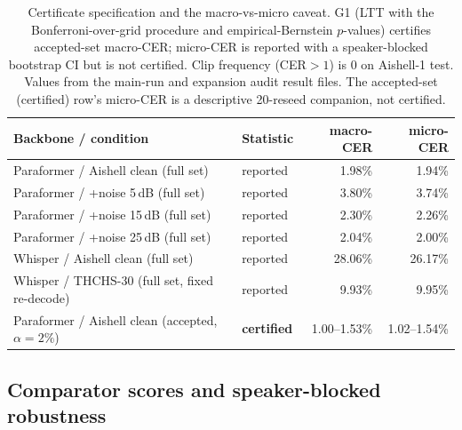\documentclass[11pt]{article}
\begin{document}
\begin{table}[t]
  \centering
  \caption{Certificate specification and the macro-vs-micro caveat. G1 (LTT with the
  Bonferroni-over-grid procedure and empirical-Bernstein $p$-values) certifies accepted-set
  macro-CER; micro-CER is reported with a speaker-blocked bootstrap CI but is
  not certified. Clip frequency (CER${}>1$) is 0 on Aishell-1 test.
  Values from the main-run and expansion audit result files. The accepted-set (certified)
  row's micro-CER is a descriptive 20-reseed companion,
  not certified.}%
  \label{tab:cert}
  \begin{tabular}{llrr}
    \toprule
    Backbone / condition & Statistic & macro-CER & micro-CER \\
    \midrule
    Paraformer / Aishell clean (full set)   & reported & 1.98\% & 1.94\% \\
    Paraformer / +noise 5\,dB (full set)    & reported & 3.80\% & 3.74\% \\
    Paraformer / +noise 15\,dB (full set)   & reported & 2.30\% & 2.26\% \\
    Paraformer / +noise 25\,dB (full set)   & reported & 2.04\% & 2.00\% \\
    Whisper / Aishell clean (full set)      & reported & 28.06\% & 26.17\% \\
    Whisper / THCHS-30 (full set, fixed re-decode) & reported & 9.93\% & 9.95\% \\
    \midrule
    Paraformer / Aishell clean (accepted, $\alpha{=}2\%$) & \textbf{certified} & 1.00--1.53\% & 1.02--1.54\% \\
    \bottomrule
  \end{tabular}
\end{table}

\subsection{Comparator scores and speaker-blocked robustness}\label{sec:comparator}
\end{document}
